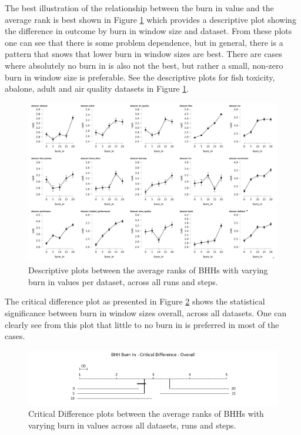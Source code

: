 The best illustration of the relationship between the burn in value and the average rank is best shown in Figure \ref{fig:results:burn_in:descriptive:descriptive} which provides a descriptive plot showing the difference in outcome by burn in window size and dataset. From these plots one can see that there is some problem dependence, but in general, there is a pattern that snows that lower burn in window sizes are best. There are cases where absolutely no burn in is also not the best, but rather a small, non-zero burn in window size is preferable. See the descriptive plots for fish toxicity, abalone, adult and air quality datasets in Figure \ref{fig:results:burn_in:descriptive:descriptive}.


\begin{figure}[htbp]
	\centering
	\includegraphics[width=\textwidth]{analysis/bhh_burn_in/figures/descriptive/descriptive.png}
	\caption{Descriptive plots between the average ranks of \Acsp{BHH} with varying burn in values per dataset, across all runs and steps.}
	\label{fig:results:burn_in:descriptive:descriptive}
\end{figure}

The critical difference plot as presented in Figure \ref{fig:results:burn_in:descriptive:cd} shows the statistical significance between burn in window sizes overall, across all datasets. One can clearly see from this plot that little to no burn in is preferred in most of the cases.


\begin{figure}[htbp]
	\centering
	\includegraphics[width=\textwidth]{analysis/bhh_burn_in/figures/cd/overall.png}
	\caption{Critical Difference plots between the average ranks of \Acsp{BHH} with varying burn in values across all datasets, runs and steps.}
	\label{fig:results:burn_in:descriptive:cd}
\end{figure}


